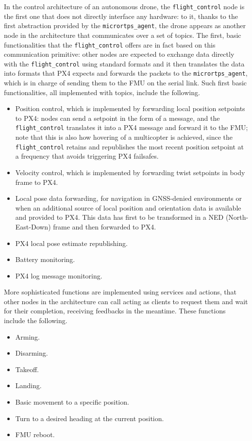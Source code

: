 In the control architecture of an autonomous drone, the \texttt{flight\_control} node is the first one that does not directly interface any hardware: to it, thanks to the first abstraction provided by the \texttt{micrortps\_agent}, the drone appears as another node in the architecture that communicates over a set of topics. The first, basic functionalities that the \texttt{flight\_control} offers are in fact based on this communication primitive: other nodes are expected to exchange data directly with the \texttt{flight\_control} using standard formats and it then translates the data into formats that PX4 expects and forwards the packets to the \texttt{micrortps\_agent}, which is in charge of sending them to the FMU on the serial link. Such first basic functionalities, all implemented with topics, include the following.
\begin{itemize}
  \item Position control, which is implemented by forwarding local position setpoints to PX4: nodes can send a setpoint in the form of a \ROS message, and the \texttt{flight\_control} translates it into a PX4 message and forward it to the FMU; note that this is also how hovering of a multicopter is achieved, since the \texttt{flight\_control} retains and republishes the most recent position setpoint at a frequency that avoids triggering PX4 failsafes.
  \item Velocity control, which is implemented by forwarding twist setpoints in body frame to PX4.
  \item Local pose data forwarding, for navigation in GNSS-denied environments or when an additional source of local position and orientation data is available and provided to PX4. This data has first to be transformed in a NED (North-East-Down) frame and then forwarded to PX4.
  \item PX4 local pose estimate republishing.
  \item Battery monitoring.
  \item PX4 log message monitoring.
\end{itemize}
More sophisticated functions are implemented using services and actions, that other nodes in the architecture can call acting as clients to request them and wait for their completion, receiving feedbacks in the meantime. These functions include the following.
\begin{itemize}
  \item Arming.
  \item Disarming.
  \item Takeoff.
  \item Landing.
  \item Basic movement to a specific position.
  \item Turn to a desired heading at the current position.
  \item FMU reboot.
\end{itemize}
